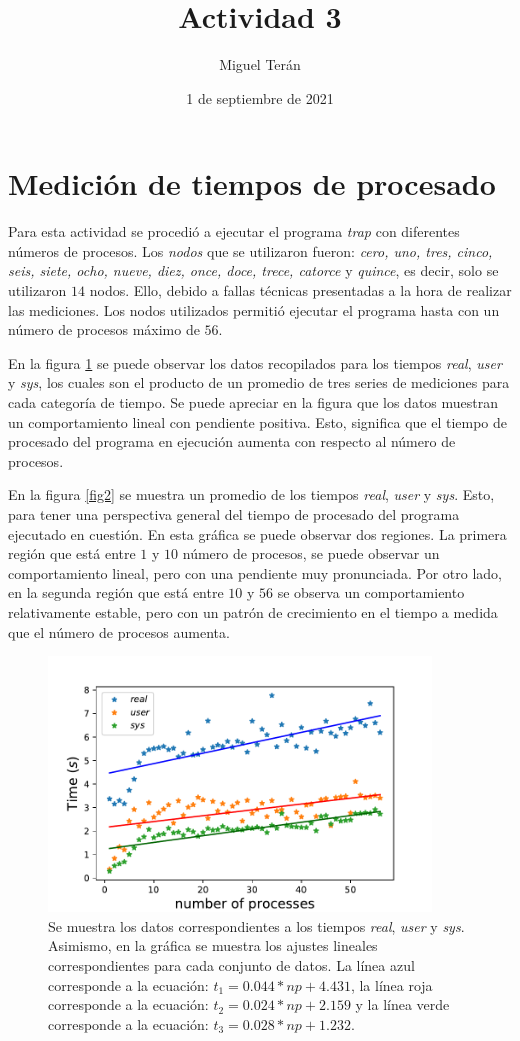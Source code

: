 \documentclass{article}
\title{Actividad 3}
\author{Miguel Terán}
\date{1 de septiembre de 2021}
\begin{document}
\maketitle
\section{Medición de tiempos de procesado}


Para esta actividad se procedió a ejecutar el programa \textit{trap} con diferentes números de procesos. Los \textit{nodos} que se utilizaron fueron: \textit{cero, uno, tres, cinco, seis, siete, ocho, nueve, diez, once, doce, trece, catorce} y \textit{quince}, es decir, solo se utilizaron $14$ nodos. Ello, debido a fallas técnicas presentadas a la hora de realizar las mediciones. Los nodos utilizados permitió ejecutar el programa hasta con un número de procesos máximo de $56$.

En la figura \ref{fig1} se puede observar los datos recopilados para los tiempos \textit{real}, \textit{user} y \textit{sys}, los cuales son el producto de un promedio de tres series de mediciones para cada categoría de tiempo. Se puede apreciar en la figura que los datos muestran un comportamiento lineal con pendiente positiva. Esto, significa que el tiempo de procesado del programa en ejecución aumenta con respecto al número de procesos.

En la figura \ref{fig2} se muestra un promedio de los tiempos \textit{real}, \textit{user} y \textit{sys}. Esto, para tener una perspectiva general del tiempo de procesado del programa ejecutado en cuestión. En esta gráfica se puede observar dos regiones. La primera región que está entre $1$ y $10$ número de procesos, se puede observar un comportamiento lineal, pero con una pendiente muy pronunciada. Por otro lado, en la segunda región que está entre $10$ y $56$ se observa un comportamiento relativamente estable, pero con un patrón de crecimiento en el tiempo a medida que el número de procesos aumenta. 

\begin{figure}[h]
    \centering
    \includegraphics[width=4in]{timeProcesses.pdf}
    \caption{Se muestra los datos correspondientes a los tiempos \textit{real}, \textit{user} y \textit{sys}. Asimismo, en la gráfica se muestra los ajustes lineales correspondientes para cada conjunto de datos. La línea azul corresponde a la ecuación: $t_1=0.044*np + 4.431$, la línea roja corresponde a la ecuación: $t_2=0.024*np + 2.159$ y la línea verde corresponde a la ecuación: $t_3 = 0.028*np + 1.232$.} \label{fig1}
\end{figure}
\end{document}
